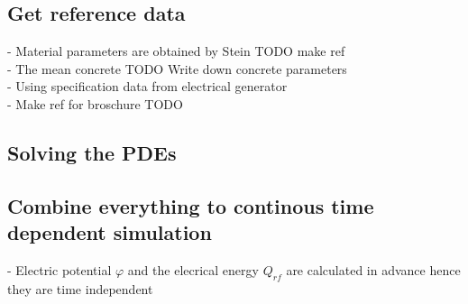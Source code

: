 \documentclass[parskip=half, titlepage=yes, 12pt, BCOR=12mm, DIV=calc]{scrartcl}
\begin{document}
\subsection{Get reference data}
- Material parameters are obtained by Stein TODO make ref \\
- The mean concrete TODO Write down concrete parameters \\
- Using specification data from electrical generator \\
- Make ref for broschure TODO \\

\subsection{Solving the PDEs}

\subsection{Combine everything to continous time dependent simulation}
- Electric potential $\varphi$ and the elecrical energy $Q_{rf}$ are calculated in advance hence they are time independent \\ 
\end{document}
